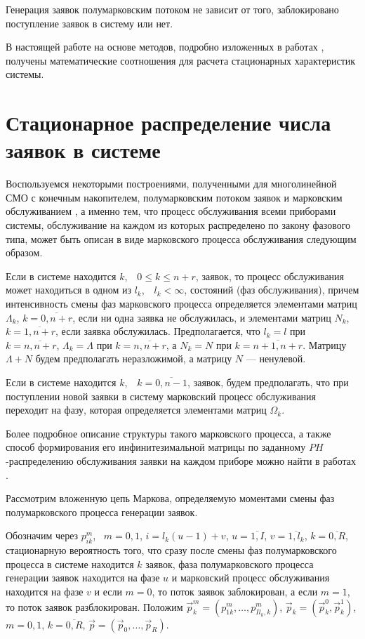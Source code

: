 \begin{multicols}{2}
Генерация заявок полумарковским потоком не зависит от того, заблокировано поступление заявок в систему или нет.

В настоящей работе на основе методов, подробно изложенных в работах \cite{PCh03,PCh04}, получены
математические соотношения для расчета стационарных характеристик системы.

\section{Стационарное распределение числа заявок в системе}

Воспользуемся некоторыми построениями,
полученными для многолинейной СМО с конечным накопителем,
полумарковским потоком заявок и марковским обслуживанием \cite{PCh04}, а именно тем,
что процесс обслуживания всеми приборами системы,
обслуживание на каждом из которых распределено по закону фазового типа,
может быть описан в виде марковского процесса обслуживания следующим образом.

Если в системе находится $k$,\ \ $0\le k\le n+r$, заявок,
то процесс обслуживания может находиться в одном из $l_k$,\ \ $l_k<\infty$, состояний (фаз обслуживания),
причем интенсивность смены фаз марковского процесса определяется элементами
матриц $\Lambda_k$, $k=\overline{0,n+r}$, если ни одна заявка не обслужилась,
и элементами матриц $N_k$, $k=\overline{1,n+r}$, если заявка обслужилась.
Предполагается, что $l_k=l$ при $k=\overline{n,n+r}$,
$\Lambda_k = \Lambda$ при $k=\overline{n,n+r}$,
а $N_k = N$ при $k=\overline{n+1,n+r}$.
Матрицу $\Lambda+N$ будем предполагать неразложимой,
а матрицу $N$ --- ненулевой.

Если в системе находится $k$,\ \ $k=\overline{0,n-1}$, заявок, будем предполагать, что
при поступлении новой заявки в систему марковский процесс обслуживания переходит на фазу,
которая определяется элементами матриц $\Omega_k$.

Более подробное описание структуры такого марковского процесса,
а также способ формирования его инфинитезимальной матрицы по
заданному $PH$-распределению обслуживания заявки на каждом приборе
можно найти в работах \cite{PCh03,PCh04}.

Рассмотрим вложенную цепь Маркова, определяемую моментами смены фаз полумарковского процесса генерации заявок.

Обозначим через
$p^m_{ik}$, \ $m=0,1$,  $i=l_k(u-1)+v$,  $u=\overline{1,I}$,
$v=\overline{1,l_k}$,  $k=\overline{0,R}$,
стационарную вероятность того, что сразу после смены фаз полумарковского процесса в системе находится $k$ заявок,
фаза полумарковского процесса генерации заявок находится на фазе $u$ и
марковский процесс обслуживания находится на фазе $v$ и если $m=0$, то поток заявок заблокирован,
а если $m=1$, то поток заявок разблокирован.
Положим $\vec{p}^m_k=(p^m_{1k},\ldots,p^m_{Il_k,k})$,
$\vec{p}_k = (\vec{p}^0_k,\vec{p}^1_k)$,
 $m=0,1$,  $k=\overline{0,R}$,  $\vec{p}=(\vec{p}_0,\ldots,\vec{p}_R)$.


\end{multicols}
